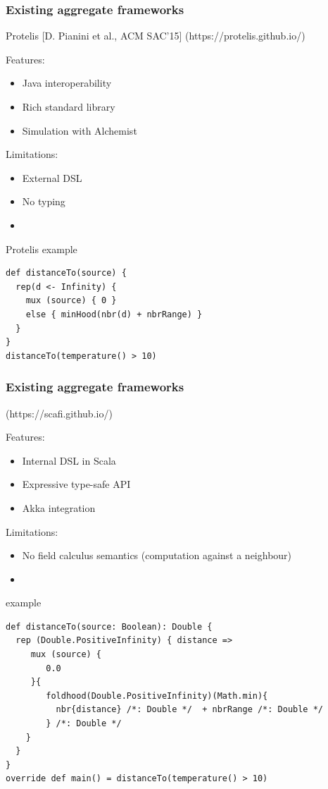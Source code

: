 \begin{frame}[fragile]
\frametitle{Existing aggregate frameworks}
\begin{block}{Protelis \small [D. Pianini et al., ACM SAC'15] (https://protelis.github.io/)}
\begin{multicols}{2}
{Features:
\begin{itemize}
\item Java interoperability
\item Rich standard library
\item Simulation with Alchemist
\end{itemize}
}
{Limitations:
\begin{itemize}
\item External DSL
\item No typing
\item[\vspace{\fill}]
\end{itemize}
}
\end{multicols}
\end{block}
\begin{block}{Protelis example}
\begin{lstlisting}[language={Protelis}]
def distanceTo(source) {
  rep(d <- Infinity) {
    mux (source) { 0 }
    else { minHood(nbr(d) + nbrRange) }
  }
}
distanceTo(temperature() > 10)
\end{lstlisting}
\end{block}
\end{frame}

\begin{frame}[fragile]
\frametitle{Existing aggregate frameworks}
\begin{block}{ (https://scafi.github.io/)}
\begin{multicols}{2}
{Features:
\begin{itemize}
\item Internal DSL in Scala
\item Expressive type-safe API
\item Akka integration
\end{itemize}
}
{Limitations:
\begin{itemize}
\item No field calculus semantics (computation against a neighbour)
\item[\vspace{\fill}]
\end{itemize}
}
\end{multicols}
\end{block}
\begin{block}{\Scafi example}
\begin{lstlisting}[language={scafi}]
def distanceTo(source: Boolean): Double {
  rep (Double.PositiveInfinity) { distance =>
     mux (source) {
        0.0
     }{
        foldhood(Double.PositiveInfinity)(Math.min){ 
          nbr{distance} /*: Double */  + nbrRange /*: Double */
        } /*: Double */
    }
  }
}
override def main() = distanceTo(temperature() > 10)
\end{lstlisting}
\end{block}
\end{frame}

